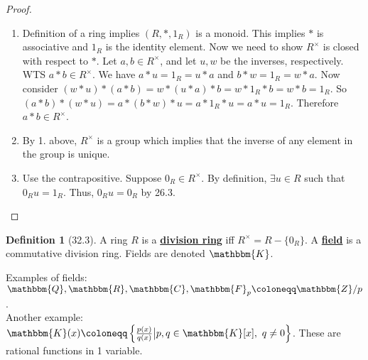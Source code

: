 \documentclass{article}
\newcommand{\Z}{\mathbbm{Z}}
\newcommand{\Q}{\mathbbm{Q}}
\newcommand{\R}{\mathbbm{R}}
\newcommand{\C}{\mathbbm{C}}
\newcommand{\coleq}{\coloneqq}
\newcommand{\define}[1]{\textbf{\underline{#1}}}
\theoremstyle{definition}
\newtheorem*{defn}{Definition}
\theoremstyle{remark}
\newcommand{\K}{\mathbbm{K}}
\begin{document}
{{            \begin{proof}
                \begin{enumerate}
                    \item Definition of a ring implies $(R,*,1_R)$ is a monoid. This implies $*$ is associative and $1_R$ is the identity element. Now we need to show $R^\times$ is closed with respect to $*$. Let $a,b\in R^\times$, and let $u,w$ be the inverses, respectively. WTS $a*b \in R^\times$. We have $a*u=1_R=u*a$ and $b*w=1_R=w*a$. Now consider $(w*u)*(a*b)=w*(u*a)*b=w*1_R*b=w*b=1_R$. So $(a*b)*(w*u)=a*(b*w)*u=a*1_R*u=a*u=1_R$. Therefore $a*b \in R^\times$.
                    \item By 1. above, $R^\times$ is a group which implies that the inverse of any element in the group is unique.
                    \item Use the contrapositive. Suppose $0_R \in R^\times$. By definition, $\exists u \in R$ such that $0_Ru=1_R$. Thus, $0_Ru=0_R$ by 26.3.
                \end{enumerate}
            \end{proof}
            
            \begin{defn}[32.3]
                A ring $R$ is a \define{division ring} iff $R^\times=R-\{0_R\}$. A \define{field} is a commutative division ring. Fields are denoted $\K$.
            \end{defn}
            
            Examples of fields: $\Q,\R,\C,\mathbbm{F}_p\coleq\Z/p$.\\
            
            Another example: $\K(x)\coleq\left\{\frac{p(x)}{q(x)}\big|p,q \in \K[x], \ q\neq 0\right\}$. These are rational functions in 1 variable.
        }
    }
\end{document}
